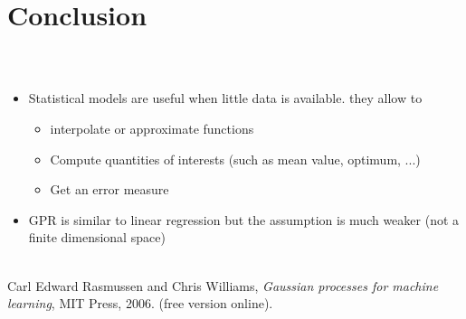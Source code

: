 \documentclass{beamer}
\begin{document}
\section{Conclusion}
\subsection{}

\begin{frame}{}
\\ \vspace{3mm}
\begin{itemize}
	\item Statistical models are useful when little data is available. they allow to
	\begin{itemize}
		\item interpolate or approximate functions
		\item Compute quantities of interests (such as mean value, optimum, ...)
		\item Get an error measure
	\end{itemize}
	\item GPR is similar to linear regression but the assumption is much weaker (not a finite dimensional space)
\end{itemize}
\vspace{5mm}
\\
Carl Edward Rasmussen and Chris Williams, \emph{Gaussian processes for machine learning}, MIT Press, 2006. (free version online).
\end{frame}


\end{document}
